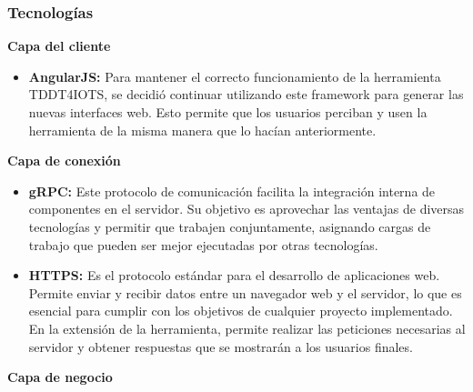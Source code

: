 \subsubsection{Tecnologías}

\textbf{Capa del cliente}

\begin{itemize}
	\item \textbf{AngularJS:} Para mantener el correcto funcionamiento de la herramienta TDDT4IOTS, se decidió continuar utilizando este framework para generar las nuevas interfaces web. Esto permite que los usuarios perciban y usen la herramienta de la misma manera que lo hacían anteriormente.
\end{itemize}

\textbf{Capa de conexión}

\begin{itemize}
	\item \textbf{gRPC:} Este protocolo de comunicación facilita la integración interna de componentes en el servidor. Su objetivo es aprovechar las ventajas de diversas tecnologías y permitir que trabajen conjuntamente, asignando cargas de trabajo que pueden ser mejor ejecutadas por otras tecnologías.
	
	\item \textbf{HTTPS:} Es el protocolo estándar para el desarrollo de aplicaciones web. Permite enviar y recibir datos entre un navegador web y el servidor, lo que es esencial para cumplir con los objetivos de cualquier proyecto implementado. En la extensión de la herramienta, permite realizar las peticiones necesarias al servidor y obtener respuestas que se mostrarán a los usuarios finales.
	
\end{itemize}

\textbf{Capa de negocio}

